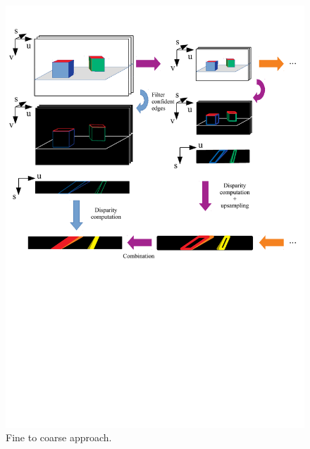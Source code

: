 \documentclass{article}
\theoremstyle{definition}
\begin{document}
\begin{figure}[ht]
\centering
 \includegraphics[width=1.0\textwidth, trim=0cm 11cm 0cm 0.5cm, clip]{drawings/fine_to_coarse.pdf}
 \caption{Fine to coarse approach.}
 \label{drawing:fine_to_coarse}
\end{figure}
\end{document}
